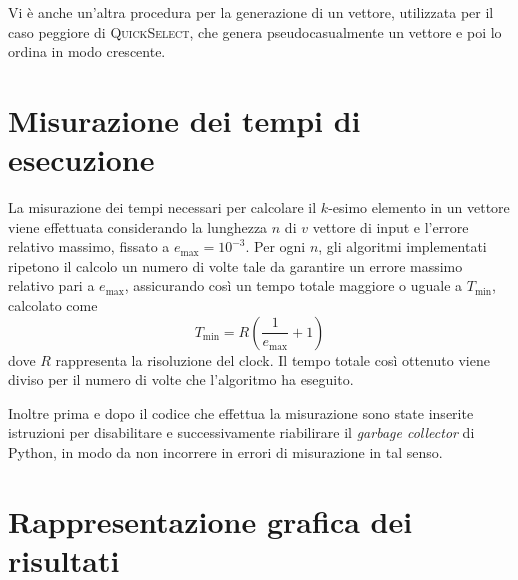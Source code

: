 \documentclass[a4paper,12pt]{article}
\newcommand{\QuickSelect}{\textsc{QuickSelect}}
\begin{document}
Vi è anche un'altra procedura per la generazione di un vettore, utilizzata per il caso peggiore di \QuickSelect{}, che genera pseudocasualmente un vettore e poi lo ordina in modo crescente.


\section{Misurazione dei tempi di esecuzione}
\label{sec:misurazione}
La misurazione dei tempi necessari per calcolare il $k$-esimo elemento in un vettore viene effettuata considerando la lunghezza \( n \) di $v$ vettore di input e l'errore relativo massimo, fissato a $e_{\max} = 10^{-3}$.
Per ogni $n$, gli algoritmi implementati ripetono il calcolo un numero di volte tale da garantire un errore massimo relativo pari a  $e_{\max}$, assicurando così un tempo totale maggiore o uguale a \( T_{\min} \), calcolato come \[ T_{\min} = R \left( \frac{1}{e_{\max}} + 1 \right) \] dove \( R \) rappresenta la risoluzione del clock.
Il tempo totale così ottenuto viene diviso per il numero di volte che l'algoritmo ha eseguito.

Inoltre prima e dopo il codice che effettua la misurazione sono state inserite istruzioni per disabilitare e successivamente riabilirare il \emph{garbage collector} di Python, in modo da non incorrere in errori di misurazione in tal senso.


\newpage

\section{Rappresentazione grafica dei risultati}
\label{sec:grafici}
\end{document}
